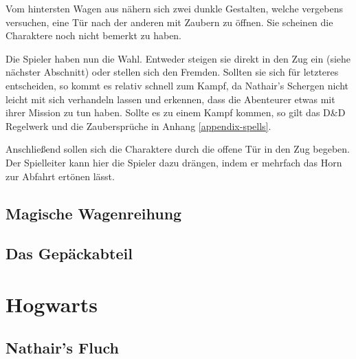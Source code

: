 \documentclass[]{scrartcl}
\begin{document}
Vom hintersten Wagen aus nähern sich zwei dunkle Gestalten, welche vergebens versuchen, eine Tür nach der anderen mit Zaubern zu öffnen. Sie scheinen die Charaktere noch nicht bemerkt zu haben.


Die Spieler haben nun die Wahl. Entweder steigen sie direkt in den Zug ein (siehe nächster Abschnitt) oder stellen sich den Fremden. Sollten sie sich für letzteres entscheiden, so kommt es relativ schnell zum Kampf, da Nathair's Schergen nicht leicht mit sich verhandeln lassen und erkennen, dass die Abenteurer etwas mit ihrer Mission zu tun haben. Sollte es zu einem Kampf kommen, so gilt das D\&D Regelwerk und die Zaubersprüche in Anhang \ref{appendix-spells}.

Anschließend sollen sich die Charaktere durch die offene Tür in den Zug begeben. Der Spielleiter kann hier die Spieler dazu drängen, indem er mehrfach das Horn zur Abfahrt ertönen lässt.

\subsection{Magische Wagenreihung}

\subsection{Das Gepäckabteil}

\section{Hogwarts}

\subsection{Nathair's Fluch}

\appendix
\end{document}
